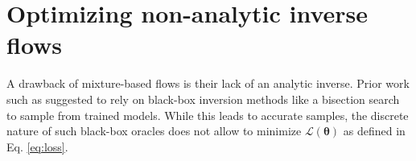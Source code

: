 \documentclass{article}
\newcommand{\jonas}[1]{{\color{red} \textbf{jonas:} #1}}
\begin{document}




\section{Optimizing non-analytic inverse flows}
\label{sec:black-box-inverse-optimization}

A drawback of mixture-based flows is their lack of an analytic inverse. Prior work such as \cite{ho2019flow++, rezende2020normalizing} suggested to rely on black-box inversion methods like a bisection search to sample from trained models. 
While this leads to accurate samples, the discrete nature of such black-box oracles does not allow to minimize $\mathcal{L}(\bm \theta)$ as defined in Eq. \eqref{eq:loss}.
\end{document}
